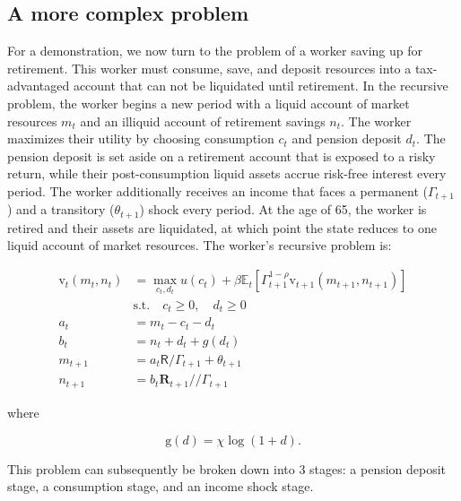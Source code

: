 \documentclass{article}
\newcommand{\DiscFac}{\beta}
\newcommand{\util}{u}
\newcommand{\tShkEmp}{\theta}
\newcommand{\Ex}{\mathbb{E}}
\newcommand{\CRRA}{\rho}
\newcommand{\bRat}{b}
\newcommand{\cRat}{c}
\newcommand{\vFunc}{\mathrm{v}}
\newcommand{\Rfree}{\mathsf{R}}
\newcommand{\PGro}{\Gamma}
\newcommand{\aRat}{a}
\newcommand{\mRat}{m}
\newcommand{\Risky}{\mathbf{R}}
\newcommand{\nRat}{n}
\newcommand{\dRat}{d}
\newcommand{\gFunc}{\mathrm{g}}
\newcommand{\xFer}{\chi}
\begin{document}
\subsection{A more complex problem}\label{A more complex problem}

For a demonstration, we now turn to the problem of a worker saving up for retirement. This worker must consume, save, and deposit resources into a tax-advantaged account that can not be liquidated until retirement. In the recursive problem, the worker begins a new period with a liquid account of market resources $\mRat_{t}$ and an illiquid account of retirement savings $\nRat_{t}$. The worker maximizes their utility by choosing consumption $\cRat_{t}$ and pension deposit $\dRat_{t}$. The pension deposit is set aside on a retirement account that is exposed to a risky return, while their post-consumption liquid assets accrue risk-free interest every period. The worker additionally receives an income that faces a permanent ($\PGro_{t+1}$) and a transitory ($\tShkEmp_{t+1}$) shock every period. At the age of 65, the worker is retired and their assets are liquidated, at which point the state reduces to one liquid account of market resources. The worker's recursive problem is:

\begin{equation}
\begin{split}
    \vFunc_{t}(\mRat_{t}, \nRat_{t}) & = \max_{\cRat_{t}, \dRat_{t}} \util(\cRat_{t}) + \DiscFac \Ex_{t} \left[ \PGro_{t+1}^{1-\CRRA} \vFunc_{t+1}(\mRat_{t+1}, \nRat_{t+1}) \right] \\
    & \text{s.t.} \quad \cRat_{t} \ge 0, \quad \dRat_{t} \ge 0 \\
    \aRat_{t} & = \mRat_{t} - \cRat_{t} - \dRat_{t} \\
    \bRat_{t} & = \nRat_{t} + \dRat_{t} + g(\dRat_{t}) \\
    \mRat_{t+1} & = \aRat_{t} \Rfree / \PGro_{t+1}  + \tShkEmp_{t+1} \\
    \nRat_{t+1} & = \bRat_{t} \Risky_{t+1} / / \PGro_{t+1}
  \end{split}
\end{equation}

where

\begin{equation}
\gFunc(\dRat) = \xFer \log(1+\dRat).
\end{equation}

This problem can subsequently be broken down into 3 stages: a pension deposit stage, a consumption stage, and an income shock stage.
\end{document}
